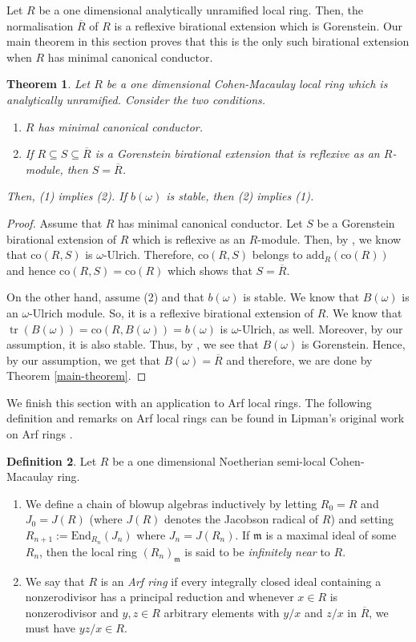 \documentclass[12pt]{amsart}
\newcommand{\End}{\mathrm{End}}
\newcommand\co{\mathrm{co}}
\newcommand{\m}{\mathfrak{m}}
\newcommand{\add}{\mathrm{add}}
\newtheorem{theorem}{Theorem}[section]
\theoremstyle{definition}
\newtheorem{definition}[theorem]{Definition}
\DeclareMathOperator{\tr}{\mathrm{tr}}
\begin{document}
Let $R$ be a one dimensional analytically unramified local ring. Then, the normalisation $\overline{R}$ of $R$ is a reflexive birational extension which is Gorenstein. Our main theorem in this section proves that this is the only such birational extension when $R$ has minimal canonical conductor.
\begin{theorem}\label{new-main-theorem}
     Let $R$ be a one dimensional Cohen-Macaulay local ring which is analytically unramified. Consider the two conditions.
    \begin{enumerate}
        \item $R$ has minimal canonical conductor.
        \item If $R \subseteq S \subseteq \overline{R}$ is a Gorenstein birational extension that is reflexive as an $R$-module, then $S = \overline{R}$. 
    \end{enumerate}
    Then, (1) implies (2). If $b(\omega)$ is stable, then (2) implies (1).
\end{theorem}
\begin{proof}
        Assume that $R$ has minimal canonical conductor. Let $S$ be a Gorenstein birational extension of $R$ which is reflexive as an $R$-module. Then, by \cite[Theorem 7.10]{Dao-Maitra-Sridhar}, we know that $\co(R,S)$ is $\omega$-Ulrich. Therefore, $\co(R,S)$ belongs to $\add_R(\co(R))$ and hence $\co(R,S) = \co(R)$ which shows that $S = \overline{R}$.

        On the other hand, assume (2) and that $b(\omega)$ is stable. We know that $B(\omega)$ is an $\omega$-Ulrich module. So, it is a reflexive birational extension of $R$. We know that $\tr(B(\omega))=\co(R, B(\omega)) = b(\omega)$ is $\omega$-Ulrich, as well. Moreover, by our assumption, it is also stable. Thus, by \cite[Theorem 7.10]{Dao-Maitra-Sridhar}, we see that $B(\omega)$ is Gorenstein. Hence, by our assumption, we get that $B(\omega) = \overline{R}$ and therefore, we are done by Theorem \ref{main-theorem}.
\end{proof}
We finish this section with an application to Arf local rings. The following definition and remarks on Arf local rings can be found in Lipman's original work on Arf rings \cite{Lipman}.
\begin{definition}
    Let $R$ be a one dimensional Noetherian semi-local Cohen-Macaulay ring.
    \begin{enumerate}
        \item We define a chain of blowup algebras inductively by letting $R_0 = R$ and $J_0 = J(R)$ (where $J(R)$ denotes the Jacobson radical of $R$) and setting $R_{n+1} := \End_{R_n}(J_n)$ where $J_n = J(R_n)$. If $\m$ is a maximal ideal of some $R_n$, then the local ring $(R_n)_\m$ is said to be \textit{infinitely near} to $R$.
        \item  We say that $R$ is an \textit{Arf ring} if every integrally closed ideal containing a nonzerodivisor has a principal reduction and whenever $x \in R$ is nonzerodivisor and $y,z \in R$ arbitrary elements with $y/x$ and $z/x$ in $\overline{R}$, we must have $yz/x \in R$.
    \end{enumerate}
\end{definition}
\end{document}
